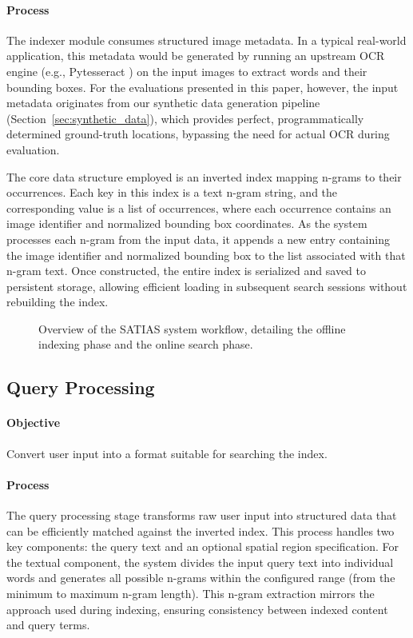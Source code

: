 \documentclass[manuscript,screen]{acmart}
\begin{document}
\paragraph{Process} The indexer module consumes structured image metadata. In a typical real-world application, this metadata would be generated by running an upstream OCR engine (e.g., Pytesseract \cite{Smith2007AnOV}) on the input images to extract words and their bounding boxes. For the evaluations presented in this paper, however, the input metadata originates from our synthetic data generation pipeline (Section~\ref{sec:synthetic_data}), which provides perfect, programmatically determined ground-truth locations, bypassing the need for actual OCR during evaluation.

The core data structure employed is an inverted index mapping n-grams to their occurrences. Each key in this index is a text n-gram string, and the corresponding value is a list of occurrences, where each occurrence contains an image identifier and normalized bounding box coordinates. As the system processes each n-gram from the input data, it appends a new entry containing the image identifier and normalized bounding box to the list associated with that n-gram text. Once constructed, the entire index is serialized and saved to persistent storage, allowing efficient loading in subsequent search sessions without rebuilding the index.

\begin{figure}[ht!] %
    \centering
    \caption{Overview of the SATIAS system workflow, detailing the offline indexing phase and the online search phase.}
    \label{fig:satias_workflow}
\end{figure}

\subsection{Query Processing}

\paragraph{Objective} Convert user input into a format suitable for searching the index.

\paragraph{Process} The query processing stage transforms raw user input into structured data that can be efficiently matched against the inverted index. This process handles two key components: the query text and an optional spatial region specification. For the textual component, the system divides the input query text into individual words and generates all possible n-grams within the configured range (from the minimum to maximum n-gram length). This n-gram extraction mirrors the approach used during indexing, ensuring consistency between indexed content and query terms.
\end{document}
